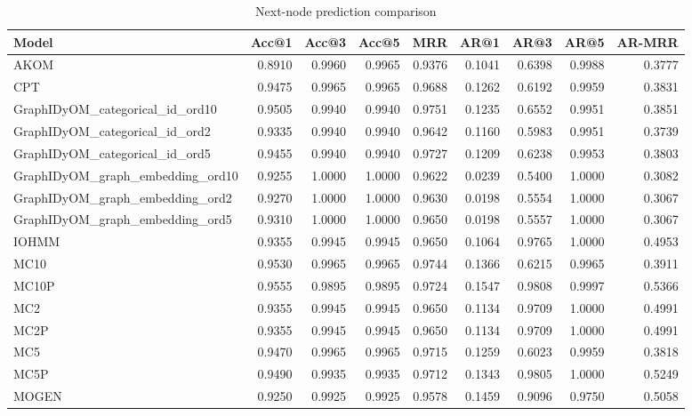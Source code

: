 \begin{table}
\caption{Next-node prediction comparison}
\label{tab:comparison}
\begin{tabular}{lrrrrrrrr}
\toprule
Model & Acc@1 & Acc@3 & Acc@5 & MRR & AR@1 & AR@3 & AR@5 & AR-MRR \\
\midrule
AKOM & 0.8910 & 0.9960 & 0.9965 & 0.9376 & 0.1041 & 0.6398 & 0.9988 & 0.3777 \\
CPT & 0.9475 & 0.9965 & 0.9965 & 0.9688 & 0.1262 & 0.6192 & 0.9959 & 0.3831 \\
GraphIDyOM_categorical_id_ord10 & 0.9505 & 0.9940 & 0.9940 & 0.9751 & 0.1235 & 0.6552 & 0.9951 & 0.3851 \\
GraphIDyOM_categorical_id_ord2 & 0.9335 & 0.9940 & 0.9940 & 0.9642 & 0.1160 & 0.5983 & 0.9951 & 0.3739 \\
GraphIDyOM_categorical_id_ord5 & 0.9455 & 0.9940 & 0.9940 & 0.9727 & 0.1209 & 0.6238 & 0.9953 & 0.3803 \\
GraphIDyOM_graph_embedding_ord10 & 0.9255 & 1.0000 & 1.0000 & 0.9622 & 0.0239 & 0.5400 & 1.0000 & 0.3082 \\
GraphIDyOM_graph_embedding_ord2 & 0.9270 & 1.0000 & 1.0000 & 0.9630 & 0.0198 & 0.5554 & 1.0000 & 0.3067 \\
GraphIDyOM_graph_embedding_ord5 & 0.9310 & 1.0000 & 1.0000 & 0.9650 & 0.0198 & 0.5557 & 1.0000 & 0.3067 \\
IOHMM & 0.9355 & 0.9945 & 0.9945 & 0.9650 & 0.1064 & 0.9765 & 1.0000 & 0.4953 \\
MC10 & 0.9530 & 0.9965 & 0.9965 & 0.9744 & 0.1366 & 0.6215 & 0.9965 & 0.3911 \\
MC10P & 0.9555 & 0.9895 & 0.9895 & 0.9724 & 0.1547 & 0.9808 & 0.9997 & 0.5366 \\
MC2 & 0.9355 & 0.9945 & 0.9945 & 0.9650 & 0.1134 & 0.9709 & 1.0000 & 0.4991 \\
MC2P & 0.9355 & 0.9945 & 0.9945 & 0.9650 & 0.1134 & 0.9709 & 1.0000 & 0.4991 \\
MC5 & 0.9470 & 0.9965 & 0.9965 & 0.9715 & 0.1259 & 0.6023 & 0.9959 & 0.3818 \\
MC5P & 0.9490 & 0.9935 & 0.9935 & 0.9712 & 0.1343 & 0.9805 & 1.0000 & 0.5249 \\
MOGEN & 0.9250 & 0.9925 & 0.9925 & 0.9578 & 0.1459 & 0.9096 & 0.9750 & 0.5058 \\
\bottomrule
\end{tabular}
\end{table}
